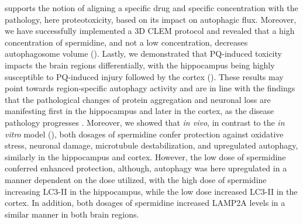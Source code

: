 supports the notion of aligning a specific drug and specific concentration with the pathology, here proteotoxicity, based on its impact on autophagic flux. Moreover, we have successfully implemented a 3D CLEM protocol and revealed that a high concentration of spermidine, and not a low concentration, decreases autophagosome volume (). Lastly, we demonstrated that PQ-induced toxicity impacts the brain regions differentially, with the hippocampus being highly susceptible to PQ-induced injury followed by the cortex (). These results may point towards region-specific autophagy activity and are in line with the findings that the pathological changes of protein aggregation and neuronal loss are manifesting first in the hippocampus and later in the cortex, as the disease pathology progresses \citep{Braak2004,Braak1998,Braak1991,Braak2012}. Moreover, we showed that \textit{in vivo}, in contrast to the \textit{in vitro} model (), both dosages of spermidine confer protection against oxidative stress, neuronal damage, microtubule destabilization, and upregulated autophagy, similarly in the hippocampus and cortex. However, the low dose of spermidine conferred enhanced protection, although, autophagy was here upregulated in a manner dependent on the dose utilized, with the high dose of spermidine increasing LC3-II in the hippocampus, while the low dose increased LC3-II in the cortex. In addition, both dosages of spermidine increased LAMP2A levels in a similar manner in both brain regions. 
 
